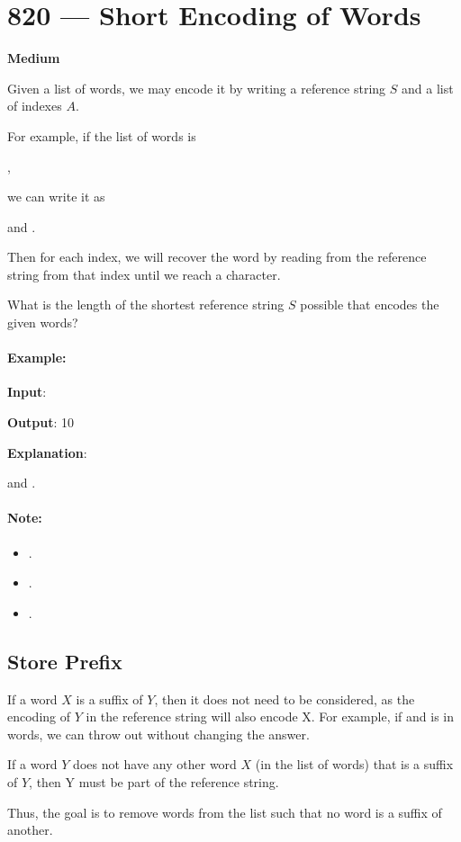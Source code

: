 \section{820 --- Short Encoding of Words}

\textbf{Medium}

Given a list of words, we may encode it by writing a reference string $S$ and a list of indexes $A$.

For example, if the list of words is 

, 

we can write it as 

 and .

Then for each index, we will recover the word by reading from the reference string from that index until we reach a  character.

What is the length of the shortest reference string $S$ possible that encodes the given words?

\paragraph{Example:}

\begin{flushleft}
	\textbf{Input}: 

\textbf{Output}: 10

\textbf{Explanation}: 

 and .
\end{flushleft}

 

\paragraph{Note:}

\begin{itemize}
	\item  {}.
    \item {}.
    \item {}.
\end{itemize}

\subsection{Store Prefix}
If a word $X$ is a suffix of $Y$, then it does not need to be considered, as the encoding of $Y$ in the reference string will also encode X. For example, if  and  is in words, we can throw out  without changing the answer.

If a word $Y$ does not have any other word $X$ (in the list of words) that is a suffix of $Y$, then Y must be part of the reference string.

Thus, the goal is to remove words from the list such that no word is a suffix of another. 

\setcounter{lstlisting}{0}


